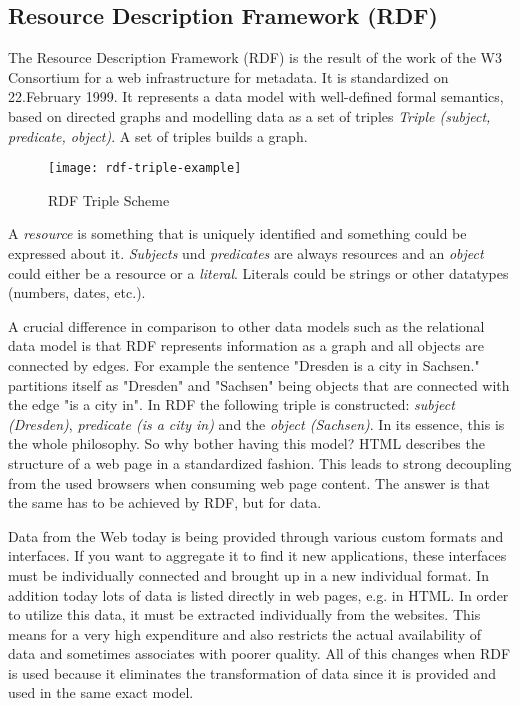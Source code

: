 \subsection{Resource Description Framework (RDF)}
The Resource Description Framework (RDF) is the result of the work of the W3 Consortium for a web infrastructure for metadata. It is standardized on 22.February 1999. It represents a data model with well-defined formal semantics, based on directed graphs and modelling data as a set of triples \textit{Triple (subject, predicate, object)}. A set of triples builds a graph.
\begin{figure}[h!]
    \texttt{[image: rdf-triple-example]}
    \caption{RDF Triple Scheme}
    \label{fig:view}
\end{figure}

A \textit{resource} is something that is uniquely identified and something could be expressed about it. \textit{Subjects} und \textit{predicates} are always resources and an \textit{object} could either be a resource or a \textit{literal}. Literals could be strings or other datatypes (numbers, dates, etc.).

A crucial difference in comparison to other data models such as the relational data model is that RDF represents information as a graph and all objects are connected by edges. For example the sentence "Dresden is a city in Sachsen." partitions itself as "Dresden" and "Sachsen" being objects that are connected with the edge "is a city in". In RDF the following triple is constructed: \textit{subject (Dresden)}, \textit{predicate (is a city in)} and the \textit{object (Sachsen)}. In its essence, this is the whole philosophy. So why bother having this model? HTML describes the structure of a web page in a standardized fashion. This leads to strong decoupling from the used browsers when consuming web page content. The answer is that the same has to be achieved by RDF, but for data.

Data from the Web today is being provided through various custom formats and interfaces. If you want to aggregate it to find it new applications, these interfaces must be individually connected and brought up in a new individual format. In addition today lots of data is listed directly in web pages, e.g. in HTML. In order to utilize this data, it must be extracted individually from the websites. This means for a very high expenditure and also restricts the actual availability of data and sometimes associates with poorer quality. All of this changes when RDF is used because it eliminates the transformation of data since it is provided and used in the same exact model.

